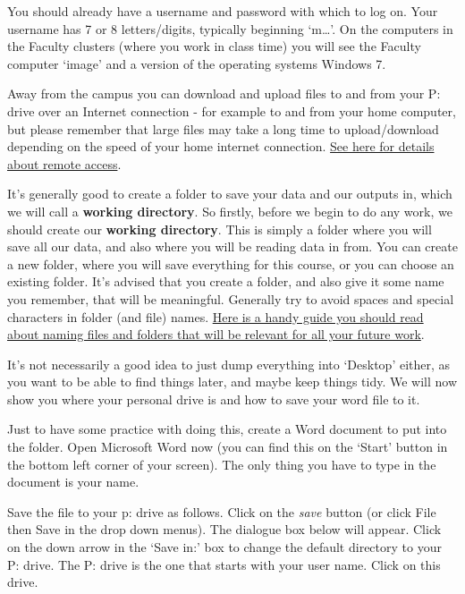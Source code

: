 \documentclass[]{book}
\theoremstyle{definition}
\theoremstyle{definition}
\theoremstyle{definition}
\theoremstyle{remark}
\begin{document}
You should already have a username and password with which to log on.
Your username has 7 or 8 letters/digits, typically beginning
`m\ldots{}'. On the computers in the Faculty clusters (where you work in
class time) you will see the Faculty computer `image' and a version of
the operating systems Windows 7.

Away from the campus you can download and upload files to and from your
P: drive over an Internet connection - for example to and from your home
computer, but please remember that large files may take a long time to
upload/download depending on the speed of your home internet connection.
\href{http://servicedesk.manchester.ac.uk/portal/app/portlets/results/viewsolution.jsp?solutionid=040918305513985\&SToken=A9F6241A4BCC47E813D7C92C68B579F7}{See
here for details about remote access}.

It's generally good to create a folder to save your data and our outputs
in, which we will call a \textbf{working directory}. So firstly, before
we begin to do any work, we should create our \textbf{working
directory}. This is simply a folder where you will save all our data,
and also where you will be reading data in from. You can create a new
folder, where you will save everything for this course, or you can
choose an existing folder. It's advised that you create a folder, and
also give it some name you remember, that will be meaningful. Generally
try to avoid spaces and special characters in folder (and file) names.
\href{http://www2.stat.duke.edu/~rcs46/lectures_2015/01-markdown-git/slides/naming-slides/naming-slides.pdf}{Here
is a handy guide you should read about naming files and folders that
will be relevant for all your future work}.

It's not necessarily a good idea to just dump everything into `Desktop'
either, as you want to be able to find things later, and maybe keep
things tidy. We will now show you where your personal drive is and how
to save your word file to it.

 Just to have some practice with doing this, create a Word document to
put into the folder. Open Microsoft Word now (you can find this on the
`Start' button in the bottom left corner of your screen). The only thing
you have to type in the document is your name.

 Save the file to your p: drive as follows. Click on the \emph{save}
button (or click File then Save in the drop down menus). The dialogue
box below will appear. Click on the down arrow in the `Save in:' box to
change the default directory to your P: drive. The P: drive is the one
that starts with your user name. Click on this drive.
\end{document}
